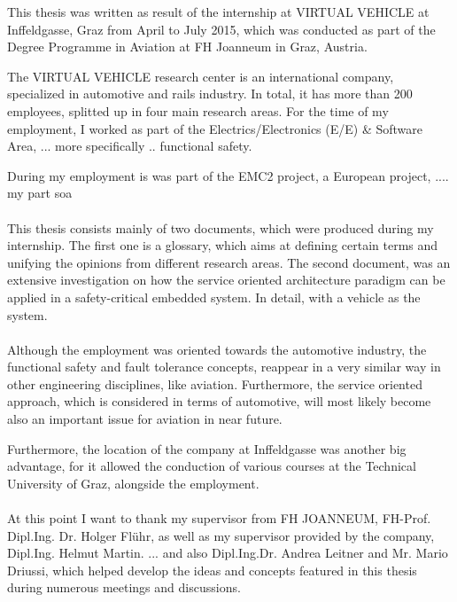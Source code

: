 This thesis was written as result of the internship at VIRTUAL VEHICLE at Inffeldgasse, Graz from April to July 2015, which was conducted as part of the Degree Programme in Aviation at FH Joanneum in Graz, Austria.

The VIRTUAL VEHICLE research center is an international company, specialized in automotive and rails industry. In total, it has more than 200 employees, splitted up in four main research areas. For the time of my employment, I worked as part of the Electrics/Electronics (E/E) \& Software Area, ... more specifically .. functional safety.

During my employment is was part of the EMC2 project, a European project, ....
my part soa
\\
\\
This thesis consists mainly of two documents, which were produced during my internship. The first one is a glossary, which aims at defining certain terms and unifying the opinions from different research areas. The second document, was an extensive investigation on how the service oriented architecture paradigm can be applied in a safety-critical embedded system. In detail, with a vehicle as the system.
\\
\\
Although the employment was oriented towards the automotive industry, the functional safety and fault tolerance concepts, reappear in a very similar way in other engineering disciplines, like aviation. Furthermore, the service oriented approach, which is considered in terms of automotive, will most likely become also an important issue for aviation in near future.

Furthermore, the location of the company at Inffeldgasse was another big advantage, for it allowed the conduction of various courses at the Technical University of Graz, alongside the employment.
\\
\\
At this point I want to thank my supervisor from FH JOANNEUM, FH-Prof. Dipl.Ing. Dr. Holger Flühr, as well as my supervisor provided by the company, Dipl.Ing. Helmut Martin. ... and also Dipl.Ing.Dr. Andrea Leitner and Mr. Mario Driussi, which helped develop the ideas and concepts featured in this thesis during numerous meetings and discussions.